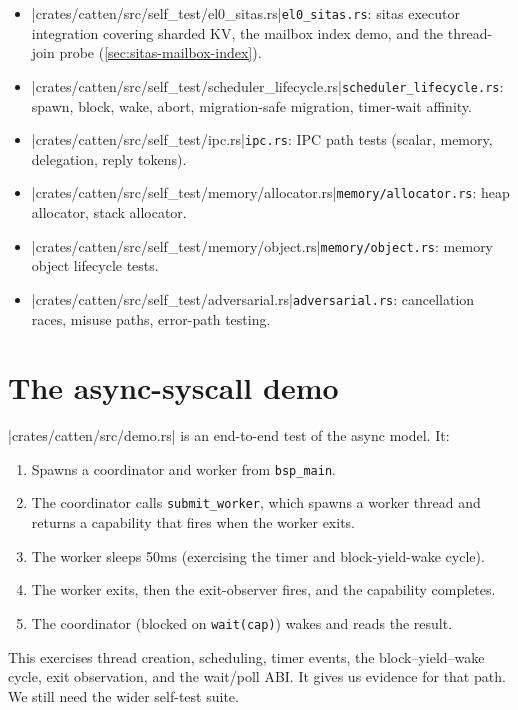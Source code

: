\begin{itemize}
    \item \repofiletext|crates/catten/src/self_test/el0_sitas.rs|{\texttt{el0\_sitas.rs}}: sitas executor integration covering sharded KV,
        the mailbox index demo, and the thread-join probe
        (\autoref{sec:sitas-mailbox-index}).
    \item \repofiletext|crates/catten/src/self_test/scheduler_lifecycle.rs|{\texttt{scheduler\_lifecycle.rs}}: spawn, block, wake, abort,
        migration-safe migration, timer-wait affinity.
    \item \repofiletext|crates/catten/src/self_test/ipc.rs|{\texttt{ipc.rs}}: IPC path tests (scalar, memory, delegation,
        reply tokens).
    \item \repofiletext|crates/catten/src/self_test/memory/allocator.rs|{\texttt{memory/allocator.rs}}: heap allocator, stack allocator.
    \item \repofiletext|crates/catten/src/self_test/memory/object.rs|{\texttt{memory/object.rs}}: memory object lifecycle tests.
    \item \repofiletext|crates/catten/src/self_test/adversarial.rs|{\texttt{adversarial.rs}}: cancellation races, misuse paths,
        error-path testing.
\end{itemize}

\section{The async-syscall demo}

\repofile|crates/catten/src/demo.rs| is an end-to-end test of the
async model. It:

\begin{enumerate}
    \item Spawns a coordinator and worker from \texttt{bsp\_main}.
    \item The coordinator calls \texttt{submit\_worker}, which spawns a worker
        thread and returns a capability that fires when the worker exits.
    \item The worker sleeps 50ms (exercising the timer and block-yield-wake
        cycle).
    \item The worker exits, then the exit-observer fires, and the capability completes.
    \item The coordinator (blocked on \texttt{wait(cap)}) wakes and reads
        the result.
\end{enumerate}

This exercises thread creation, scheduling, timer events, the block--yield--wake
cycle, exit observation, and the wait/poll ABI. It gives us evidence for that
path. We still need the wider self-test suite.

